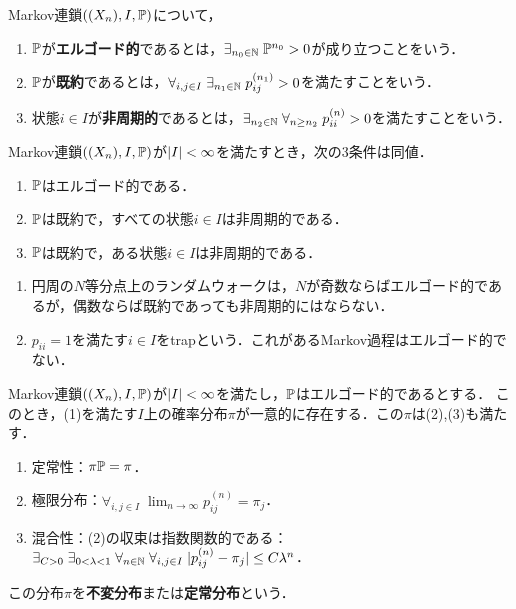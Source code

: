 \documentclass[uplatex,dvipdfmx]{jsreport}
\begin{document}
\begin{definition}
    Markov連鎖$((X_n),I,\mathbb{P})$について，
    \begin{enumerate}
        \item $\mathbb{P}$が\textbf{エルゴード的}であるとは，$\exists_{n_0\in\mathbb{N}}\;\mathbb{P}^{n_0}>0$が成り立つことをいう．
        \item $\mathbb{P}$が\textbf{既約}であるとは，$\forall_{i,j\in I}\;\exists_{n_1\in\mathbb{N}}\;p_{ij}^{(n_1)}>0$を満たすことをいう．
        \item 状態$i\in I$が\textbf{非周期的}であるとは，$\exists_{n_2\in\mathbb{N}}\;\forall_{n\ge n_2}\;p_{ii}^{(n)}>0$を満たすことをいう．
    \end{enumerate}
\end{definition}

\begin{lemma}[エルゴード性の特徴付け]
    Markov連鎖$((X_n),I,\mathbb{P})$が$\lvert I\rvert<\infty$を満たすとき，次の3条件は同値．
    \begin{enumerate}
        \item $\mathbb{P}$はエルゴード的である．
        \item $\mathbb{P}$は既約で，すべての状態$i\in I$は非周期的である．
        \item $\mathbb{P}$は既約で，ある状態$i\in I$は非周期的である．
    \end{enumerate}
\end{lemma}

\begin{example}\mbox{}
    \begin{enumerate}
        \item 円周の$N$等分点上のランダムウォークは，$N$が奇数ならばエルゴード的であるが，偶数ならば既約であっても非周期的にはならない．
        \item $p_{ii}=1$を満たす$i\in I$をtrapという．これがあるMarkov過程はエルゴード的でない．
    \end{enumerate}
\end{example}

\begin{theorem}[有限状態Markov過程のエルゴード定理]
    Markov連鎖$((X_n),I,\mathbb{P})$が$\lvert I\rvert<\infty$を満たし，$\mathbb{P}$はエルゴード的であるとする．
    このとき，(1)を満たす$I$上の確率分布$\pi$が一意的に存在する．この$\pi$は(2),(3)も満たす．
    \begin{enumerate}
        \item 定常性：$\pi\mathbb{P}=\pi$．
        \item 極限分布：$\forall_{i,j\in I}\;\lim_{n\to\infty}p_{ij}^{(n)}=\pi_j$．
        \item 混合性：(2)の収束は指数関数的である：$\exists_{C>0}\;\exists_{0<\lambda<1}\;\forall_{n\in\mathbb{N}}\;\forall_{i,j\in I}\;\lvert p_{ij}^{(n)}-\pi_j\rvert\le C\lambda^n$．
    \end{enumerate}
    この分布$\pi$を\textbf{不変分布}または\textbf{定常分布}という．
\end{theorem}
\end{document}
